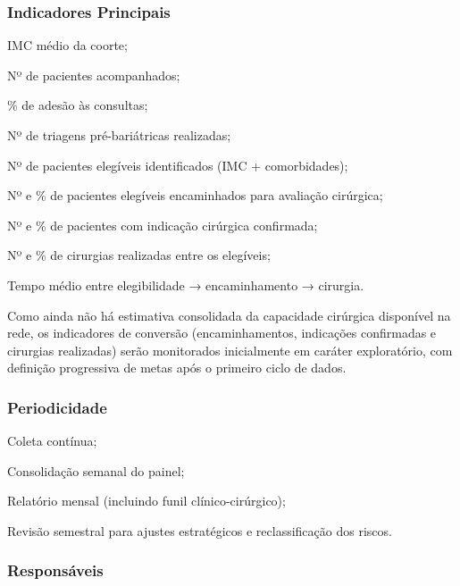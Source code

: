 \documentclass[12pt]{article}
\begin{document}
\subsubsection{Indicadores Principais}
\label{sec:org60a197c}

\begin{hlevelthree}
\item IMC médio da coorte;
\item Nº de pacientes acompanhados;
\item \% de adesão às consultas;
\item Nº de triagens pré-bariátricas realizadas;
\item Nº de pacientes elegíveis identificados (IMC + comorbidades);
\item Nº e \% de pacientes elegíveis encaminhados para avaliação cirúrgica;
\item Nº e \% de pacientes com indicação cirúrgica confirmada;
\item Nº e \% de cirurgias realizadas entre os elegíveis;
\item Tempo médio entre elegibilidade → encaminhamento → cirurgia.
\end{hlevelthree}

Como ainda não há estimativa consolidada da capacidade cirúrgica disponível na rede, os indicadores de conversão (encaminhamentos, indicações confirmadas e cirurgias realizadas) serão monitorados inicialmente em caráter exploratório, com definição progressiva de metas após o primeiro ciclo de dados.

\subsubsection{Periodicidade}
\label{sec:orgddf9b3e}

\begin{hlevelthree}
\item Coleta contínua;
\item Consolidação semanal do painel;
\item Relatório mensal (incluindo funil clínico-cirúrgico);
\item Revisão semestral para ajustes estratégicos e reclassificação dos riscos.
\end{hlevelthree}

\subsubsection{Responsáveis}
\label{sec:org890bea5}
\end{document}
